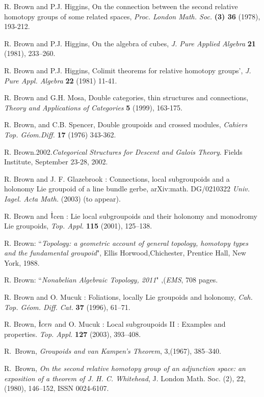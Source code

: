 \documentclass[12pt]{article}
\theoremstyle{plain}
\theoremstyle{definition}
\numberwithin{equation}{section}
\begin{document}
\begin{thebibliography}{99}
 R. Brown  and P.J. Higgins, On the connection between the second relative %
homotopy groups of some related spaces,  {\em Proc. London Math. Soc.} \textbf{ (3) 36} %
(1978), 193-212.

 R. Brown and P.J. Higgins, On the algebra of cubes, {\em J. Pure Applied %
Algebra} \textbf{21 }(1981), 233--260.

 R. Brown  and P.J. Higgins, Colimit theorems for relative homotopy groups', %
{\em J. Pure Appl. Algebra} \textbf{22} (1981) 11-41.

R. Brown  and G.H. Mosa, Double categories, thin structures and connections,{\it %
Theory and Applications of Categories}  {\bf 5} (1999), 163-175.

R. Brown,  and C.B. Spencer, Double groupoids and crossed modules, {\it 
Cahiers Top. G\'eom.Diff.} {\bf 17} (1976) 343-362.

R. Brown.2002.\emph{Categorical Structures for Descent and Galois Theory}. Fields Institute, September 23-28, 2002.

R. Brown and J. F. Glazebrook : Connections, local subgroupoids and a holonomy Lie groupoid of a line bundle gerbe, arXiv:math. DG/0210322 \emph{Univ. Iagel. Acta Math.} (2003) (to appear).


R. Brown and $\dot{\rm I}$cen : Lie local subgroupoids and their holonomy and monodromy Lie groupoids,
\emph{Top. Appl.} \textbf{115} (2001), 125--138.


R. Brown: ``{\em Topology: a geometric account of general topology, homotopy types and 
the fundamental groupoid}", Ellis Horwood,Chichester, Prentice Hall, New York, 1988.

R. Brown: ``{\em Nonabelian Algebraic Topology, 2011}" ,(\emph{EMS}, 708 pages.

R. Brown and O. Mucuk : Foliations, locally Lie groupoids and holonomy, \emph{Cah. Top. G\'eom. Diff. Cat.} {\bf 37} (1996), 61--71.


R. Brown,  $\dot{\rm I}cen$ and O. Mucuk : Local
subgroupoids II : Examples and properties. \emph{Top. Appl.}
{\bf 127} (2003), 393--408.

R.~{B}rown, {\em Groupoids and {van Kampen}'s Theorem}, 3,(1967), 385--340.

R.~Brown, {\em On the second relative homotopy group of an
adjunction space: an exposition of a theorem of {J}. {H}. {C}. {W}hitehead}, J. London Math.
  Soc. (2), 22, (1980), 146--152, ISSN 0024-6107.


\end{thebibliography}
\end{document}
